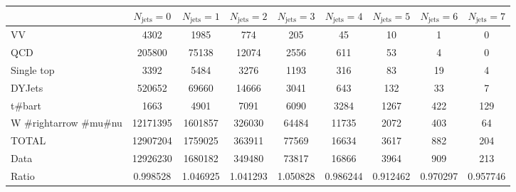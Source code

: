 \footnotesize{
\begin{tabular}{l|cccccccc} 
  &  $N_{\text{jets}} = 0 $ & $N_{\text{jets}} = 1 $ & $N_{\text{jets}} = 2 $ & $N_{\text{jets}} = 3 $ & $N_{\text{jets}} = 4 $ & $N_{\text{jets}} = 5 $ & $N_{\text{jets}} = 6 $ & $N_{\text{jets}} = 7$ \\ \hline 
   VV        & 4302 & 1985 & 774 & 205 & 45 & 10 & 1 & 0 \\ 
   QCD        & 205800 & 75138 & 12074 & 2556 & 611 & 53 & 4 & 0 \\ 
   Single top        & 3392 & 5484 & 3276 & 1193 & 316 & 83 & 19 & 4 \\ 
   DYJets        & 520652 & 69660 & 14666 & 3041 & 643 & 132 & 33 & 7 \\ 
   t#bar{t}        & 1663 & 4901 & 7091 & 6090 & 3284 & 1267 & 422 & 129 \\ 
   W #rightarrow #mu#nu        & 12171395 & 1601857 & 326030 & 64484 & 11735 & 2072 & 403 & 64 \\ 
 \hline 
 TOTAL & 12907204 & 1759025 & 363911 & 77569 & 16634 & 3617 & 882 & 204 \\ 
 \hline 
 Data          & 12926230 & 1680182 & 349480 & 73817 & 16866 & 3964 & 909 & 213 \\ 
  Ratio          & 0.998528 & 1.046925 & 1.041293 & 1.050828 & 0.986244 & 0.912462 & 0.970297 & 0.957746 \\ 
 \end{tabular}}